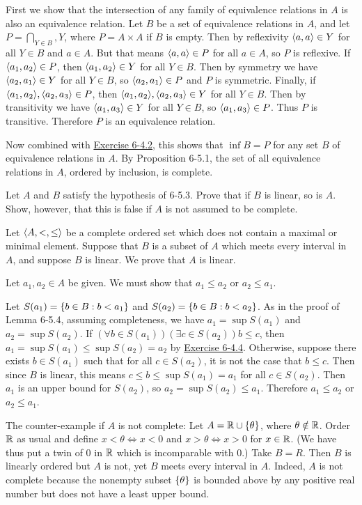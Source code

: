 \begin{solution}
First we show that the intersection of any family of equivalence relations in $A$ is also an equivalence
relation. Let $B$ be a set of equivalence relations in $A$, and let $P=\bigcap_{Y\in B}, Y$,
where $P=A\times A$ if $B$ is empty.
Then by reflexivity $\left\langle a,a\right\rangle\in Y$ for all $Y\in B$ and $a\in A$. But that means $\left\langle a,a\right\rangle\in P$ for all $a\in A$,
so $P$ is reflexive.
If $\left\langle a_1,a_2\right\rangle\in P$, then $\left\langle a_1,a_2\right\rangle\in Y$ for all $Y\in B$. Then by symmetry
we have $\left\langle a_2,a_1\right\rangle\in Y$ for all $Y\in B$, so $\left\langle a_2,a_1\right\rangle\in P$ and $P$ is symmetric.
Finally, if $\aprn{a_1,a_2},\aprn{a_2,a_3}\in P$, then $\aprn{a_1,a_2},\aprn{a_2,a_3}\in Y$ for all $Y\in B$.
Then by transitivity we have $\left\langle a_1,a_3\right\rangle\in Y$ for all $Y\in B$, so $\left\langle a_1,a_3\right\rangle\in P$.
Thus $P$ is transitive.
Therefore $P$ is an equivalence relation.

Now combined with \hyperref[ex:6-4.2]{Exercise 6-4.2}, this shows that $\inf B=P$ for any set $B$
of equivalence relations in $A$.
By Proposition 6-5.1, the set of all equivalence relations in $A$, ordered by inclusion, is complete.
\end{solution}

\begin{exercise}
Let $A$ and $B$ satisfy the hypothesis of 6-5.3. Prove that if $B$ is linear, so is $A$. Show,
however, that this is false if $A$ is not assumed to be complete.
\end{exercise}

\begin{solution}
Let $\left\langle A,<,\leq\right\rangle$ be a complete ordered set which does not
contain a maximal or minimal element. Suppose that $B$ is a subset of $A$ which meets
every interval in $A$, and suppose $B$ is linear. We prove that $A$ is linear.

Let $a_1,a_2\in A$ be given. We must show that $a_1\leq a_2$ or $a_2\leq a_1$.

Let $S(a_1)=\left\{ b\in B : b < a_1 \right\}$ and $S(a_2)=\left\{ b\in B : b < a_2 \right\}$.
As in the proof of Lemma 6-5.4, assuming completeness, we have $a_1=\sup{S(a_1)}$ and $a_2=\sup{S(a_2)}$.
If $(\forall b\in S(a_1))(\exists c\in S(a_2)) b\leq c$, then $a_1=\sup{S(a_1)}\leq\sup{S(a_2)}=a_2$
by \hyperref[ex:6-4.4]{Exercise 6-4.4}.
Otherwise, suppose there exists $b\in S(a_1)$ such that for all $c\in S(a_2)$,
it is not the case that $b\leq c$. Then since $B$ is linear, this means $c\leq b\leq\sup{S(a_1)}=a_1$ for all
$c\in S(a_2)$.
Then $a_1$ is an upper bound for $S(a_2)$, so $a_2=\sup{S(a_2)}\leq a_1$.
Therefore $a_1\leq a_2$ or $a_2\leq a_1$.

The counter-example if $A$ is not complete: Let $A = \mathbb{R}\cup\left\{\theta\right\}$, where $\theta\notin \mathbb{R}$. 
Order $\mathbb{R}$
as usual and define $x<\theta\iff x<0$ and $x>\theta\iff x>0$ for $x\in\mathbb{R}$.
(We have thus put a twin of 0 in $\mathbb{R}$ which is incomparable with 0.) Take $B = R$. Then $B$ is linearly
ordered but $A$ is not, yet $B$ meets every interval in $A$. Indeed, $A$ is not complete because
the nonempty subset $\left\{\theta\right\}$ is bounded above by any positive real number but does not have
a least upper bound.
\end{solution}


